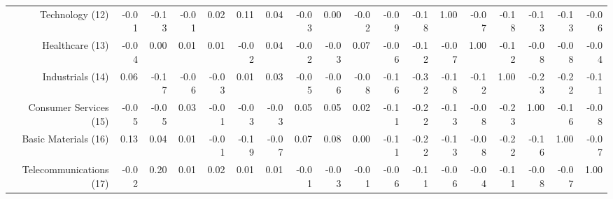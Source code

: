 \begin{sidewaystable}
{\begin{tabular}{rrrrrrrrrrrrrrrrrr}
Technology (12)         & -0.01 & -0.13 & -0.01 & 0.02  & 0.11  & 0.04  & -0.03 & 0.00  & -0.02 & -0.09 & -0.18 & 1.00  & -0.07 & -0.18 & -0.13 & -0.13 & -0.06 \\
Healthcare (13)         & -0.04 & 0.00  & 0.01  & 0.01  & -0.02 & 0.04  & -0.02 & -0.03 & 0.07  & -0.06 & -0.12 & -0.07 & 1.00  & -0.12 & -0.08 & -0.08 & -0.04 \\
Industrials (14)        & 0.06  & -0.17 & -0.06 & -0.03 & 0.01  & 0.03  & -0.05 & -0.06 & -0.08 & -0.16 & -0.32 & -0.18 & -0.12 & 1.00  & -0.23 & -0.22 & -0.11 \\
Consumer Services (15)  & -0.05 & -0.05 & 0.03  & -0.01 & -0.03 & -0.03 & 0.05  & 0.05  & 0.02  & -0.11 & -0.22 & -0.13 & -0.08 & -0.23 & 1.00  & -0.16 & -0.08 \\
Basic Materials (16)    & 0.13  & 0.04  & 0.01  & -0.01 & -0.19 & -0.07 & 0.07  & 0.08  & 0.00  & -0.11 & -0.22 & -0.13 & -0.08 & -0.22 & -0.16 & 1.00  & -0.07 \\
Telecommunications (17) & -0.02 & 0.20  & 0.01  & 0.02  & 0.01  & 0.01  & -0.01 & -0.03 & -0.01 & -0.06 & -0.11 & -0.06 & -0.04 & -0.11 & -0.08 & -0.07 & 1.00 
           \\ 
   \bottomrule
\end{tabular}}
\end{sidewaystable}

